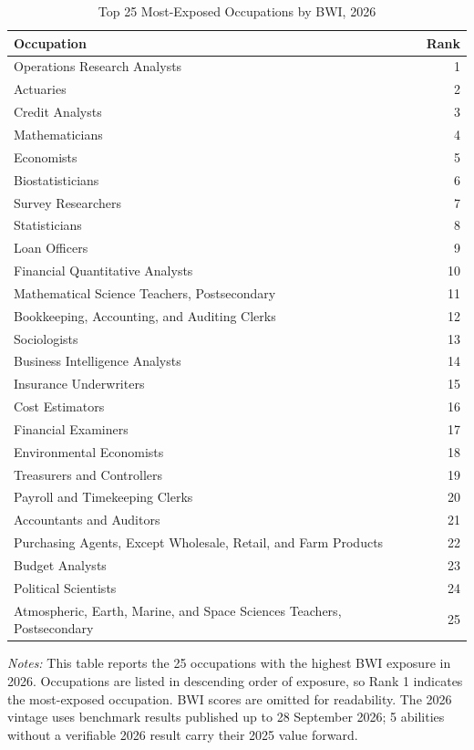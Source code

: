 \begin{table}[htbp]\centering
\caption{Top 25 Most-Exposed Occupations by BWI, 2026}\label{tab:top25}
\begin{tabular}{lr}\toprule
Occupation & Rank \\ \midrule
Operations Research Analysts & 1 \\
Actuaries & 2 \\
Credit Analysts & 3 \\
Mathematicians & 4 \\
Economists & 5 \\
Biostatisticians & 6 \\
Survey Researchers & 7 \\
Statisticians & 8 \\
Loan Officers & 9 \\
Financial Quantitative Analysts & 10 \\
Mathematical Science Teachers, Postsecondary & 11 \\
Bookkeeping, Accounting, and Auditing Clerks & 12 \\
Sociologists & 13 \\
Business Intelligence Analysts & 14 \\
Insurance Underwriters & 15 \\
Cost Estimators & 16 \\
Financial Examiners & 17 \\
Environmental Economists & 18 \\
Treasurers and Controllers & 19 \\
Payroll and Timekeeping Clerks & 20 \\
Accountants and Auditors & 21 \\
Purchasing Agents, Except Wholesale, Retail, and Farm Products & 22 \\
Budget Analysts & 23 \\
Political Scientists & 24 \\
Atmospheric, Earth, Marine, and Space Sciences Teachers, Postsecondary & 25 \\
\bottomrule\end{tabular}
\begin{minipage}{0.95\linewidth}\footnotesize \textit{Notes:} This table reports the 25 occupations with the highest BWI exposure in 2026. Occupations are listed in descending order of exposure, so Rank 1 indicates the most-exposed occupation. BWI scores are omitted for readability. The 2026 vintage uses benchmark results published up to 28 September 2026; 5 abilities without a verifiable 2026 result carry their 2025 value forward.\end{minipage}
\end{table}
